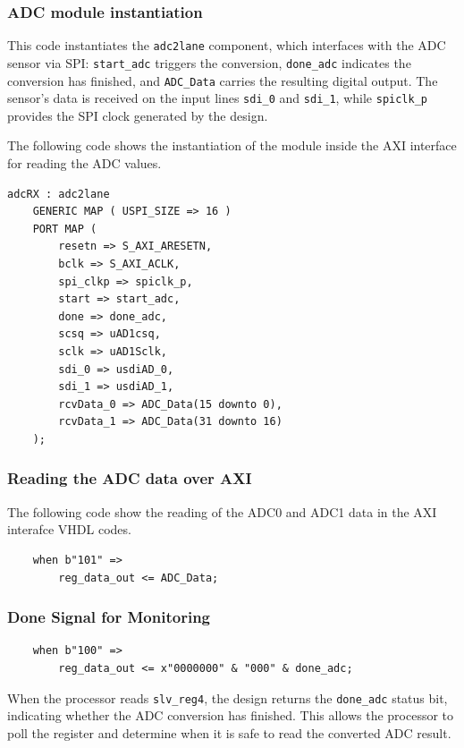 \subsubsection{ADC module instantiation}
This code instantiates the \texttt{adc2lane} component, which interfaces with the ADC sensor via SPI: \texttt{start\_adc} triggers the conversion, \texttt{done\_adc} indicates the conversion has finished, and \texttt{ADC\_Data} carries the resulting digital output. The sensor's data is received on the input lines \texttt{sdi\_0} and \texttt{sdi\_1}, while \texttt{spiclk\_p} provides the SPI clock generated by the design.

The following code shows the instantiation of the module inside the AXI interface for reading the ADC values. 
\begin{verbatim}
adcRX : adc2lane
    GENERIC MAP ( USPI_SIZE => 16 )
    PORT MAP (
        resetn => S_AXI_ARESETN,
        bclk => S_AXI_ACLK,
        spi_clkp => spiclk_p,
        start => start_adc,
        done => done_adc,
        scsq => uAD1csq,
        sclk => uAD1Sclk,
        sdi_0 => usdiAD_0,
        sdi_1 => usdiAD_1,
        rcvData_0 => ADC_Data(15 downto 0),
        rcvData_1 => ADC_Data(31 downto 16)
    );
\end{verbatim}



\subsubsection{Reading the ADC data over AXI}
The following code show the reading of the ADC0 and ADC1 data in the AXI interafce VHDL codes.  
\begin{verbatim}
	when b"101" =>
	    reg_data_out <= ADC_Data;

\end{verbatim}

\subsubsection{Done Signal for Monitoring}
\begin{verbatim}
	when b"100" =>
	    reg_data_out <= x"0000000" & "000" & done_adc;
\end{verbatim}
When the processor reads \texttt{slv\_reg4}, the design returns the \texttt{done\_adc} status bit, indicating whether the ADC conversion has finished. This allows the processor to poll the register and determine when it is safe to read the converted ADC result.


